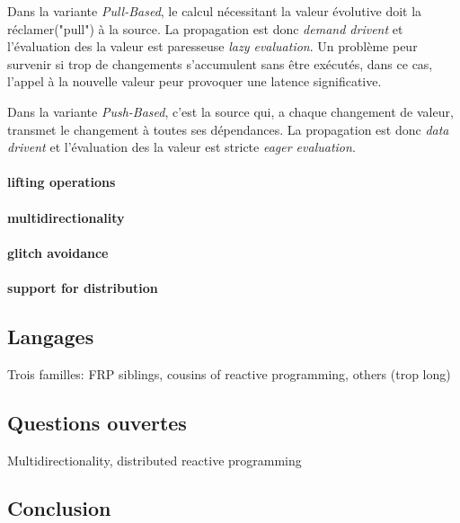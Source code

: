 \documentclass[11pt]{article}
\begin{document}
\begin{multicols}{2}
Dans la variante \textit{Pull-Based}, le calcul nécessitant la valeur évolutive doit la réclamer("pull") à la source. La propagation est donc \textit{demand drivent} et l'évaluation des la valeur est paresseuse \textit{lazy evaluation}. Un problème peur survenir si trop de changements s'accumulent sans être exécutés, dans ce cas, l'appel à la nouvelle valeur peur provoquer une latence significative.

Dans la variante \textit{Push-Based}, c'est la source qui, a chaque changement de valeur, transmet le changement à toutes ses dépendances. La propagation est donc \textit{data drivent} et l'évaluation des la valeur est stricte \textit{eager evaluation}.

\paragraph{lifting operations}

\paragraph{multidirectionality}

\paragraph{glitch avoidance}

\paragraph{support for distribution}

\subsection*{Langages}
Trois familles: FRP siblings, cousins of reactive programming, others (trop long)

\subsection*{Questions ouvertes}
Multidirectionality, distributed reactive programming 

\subsection*{Conclusion}

\end{multicols}
\end{document}
